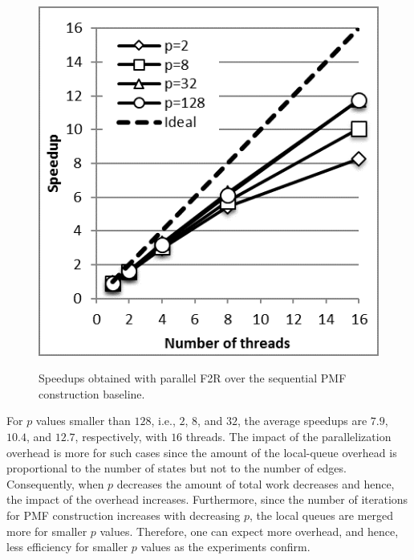 \documentclass[12pt]{article}
\begin{document}
\begin{figure}[ht]
{		\includegraphics[height=0.33\textheight]{figs/spF2R_8000.png}
	}
	\caption{Speedups obtained with parallel F2R over the sequential PMF construction baseline.}
	\label{fig:f2r-speedup}
\end{figure}

For $p$ values smaller than $128$, i.e., $2$, $8$, and $32$, the average speedups are $7.9$, $10.4$,  and $12.7$, respectively, with $16$ threads. The impact of the parallelization overhead is more for such cases since the amount of the local-queue overhead is proportional to the number of states but not to the number of edges. Consequently, when $p$ decreases the amount of total work decreases and hence, the impact of the overhead increases. Furthermore, since the number of iterations for PMF construction increases with decreasing $p$, the local queues are merged more for smaller $p$ values. Therefore, one can expect more overhead, and hence, less efficiency for smaller $p$ values as the experiments confirm.
\end{document}
